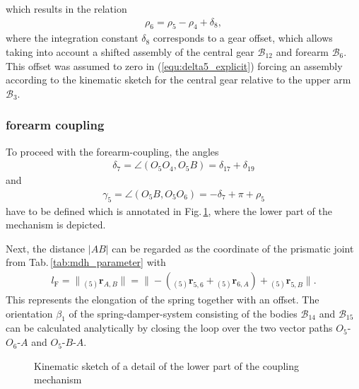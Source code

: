 \documentclass[letterpaper, 10 pt, conference]{ieeeconf}  %
\newcommand{\body}[1]{\mathcal{B}_{#1}}
\newcommand{\ortvek}[3]{{ }_{(#1)}{\boldsymbol{r}}^{#2}_{#3}}
\begin{document}
%
which results in the relation
%
\begin{align}
\rho_6 = \rho_5 - \rho_4 + \delta_8,
\label{equ:rho6_explicit}
\end{align}
%
where the integration constant $\delta_8$ corresponds to a gear offset, which allows taking into account a shifted assembly of the central gear $\body{12}$ and forearm $\body{6}$. This offset was assumed to zero in (\ref{equ:delta5_explicit}) forcing an assembly according to the kinematic sketch for the central gear relative to the upper arm $\body{3}$.

\subsubsection{forearm coupling}

To proceed with the forearm-coupling, the angles 
%
\begin{align}
\delta_7 = \angle(O_5O_4, O_5B) = \delta_{17}+\delta_{19}
\end{align}
%
and
%
\begin{align}
\gamma_5 = \angle(O_5B, O_5O_6) = -\delta_7+\pi+\rho_5
\end{align}
%
have to be defined which is annotated in Fig.\,\ref{fig:KAS5_lower_coupling}, where the lower part of the mechanism is depicted.

Next, the distance $|AB|$ can be regarded as the coordinate of the prismatic joint from Tab.\,\ref{tab:mdh_parameter} with
%
\begin{align}
l_\mathrm{F} = \|\ortvek{5}{}{A,B}\| = \|-(\ortvek{5}{}{5,6}+\ortvek{5}{}{6,A}) + \ortvek{5}{}{5,B}\|.
\end{align}
%
This represents the elongation of the spring together with an offset.
The orientation $\beta_1$ of the spring-damper-system consisting of the bodies $\body{14}$ and $\body{15}$ can be calculated analytically by closing the loop over the two vector paths $O_5$-$O_6$-$A$ and $O_5$-$B$-$A$.

\begin{figure}[htb]
    \small
    \begin{minipage}[t]{7.5cm}
        \vspace{0.2cm} %
        
    \end{minipage}
    
    \caption{Kinematic sketch of a detail of the lower part of the coupling mechanism}
    \label{fig:KAS5_lower_coupling}
\end{figure}
\end{document}
